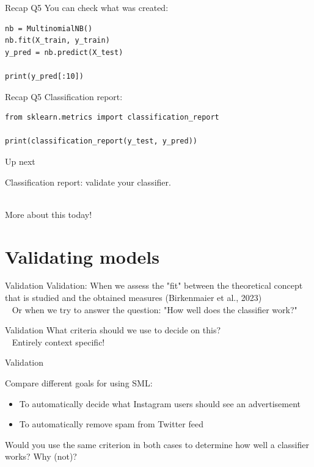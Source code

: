 \documentclass[compress]{beamer}
\begin{document}
\begin{frame}[fragile]{Recap Q5}
You can check what was created:
\begin{lstlisting}
nb = MultinomialNB()
nb.fit(X_train, y_train)
y_pred = nb.predict(X_test)

print(y_pred[:10])
\end{lstlisting}
	
\begin{lstlistingoutput}
\end{lstlistingoutput}
\end{frame}


\begin{frame}[fragile]{Recap Q5}
Classification report:
\begin{lstlisting}
from sklearn.metrics import classification_report
		
print(classification_report(y_test, y_pred))
\end{lstlisting}
	
\end{frame}


\begin{frame}{Up next}
	
Classification report: validate your classifier. \\\
	
More about this today!
\end{frame}


\section{Validating models}

\begin{frame}{Validation}
Validation: When we assess the "fit" between the theoretical concept that is studied and the obtained measures (Birkenmaier et al., 2023) \\\
\pause
Or when we try to answer the question: "How well does the classifier work?"
\end{frame}

\begin{frame}{Validation}
What criteria should we use to decide on this?\\\
\pause
Entirely context specific!
\end{frame}


\begin{frame}[fragile]{Validation}
\begin{alertblock}{Compare different goals for using SML:}
	\begin{itemize}
		\item To automatically decide what Instagram users should see an advertisement
		\item To automatically remove spam from Twitter feed
	\end{itemize}
\end{alertblock}

Would you use the same criterion in both cases to determine how well a classifier works? Why (not)?
\end{frame}
\end{document}
